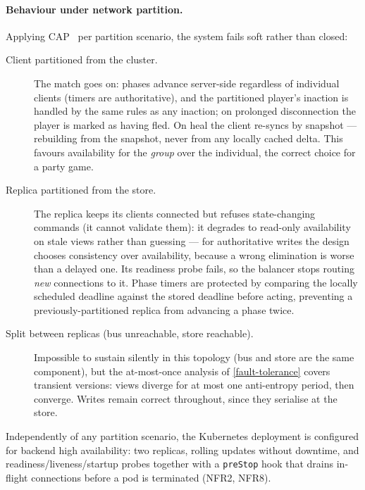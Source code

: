 \documentclass{scrartcl}
\begin{document}
\paragraph{Behaviour under network partition.}
Applying CAP~\cite{gilbert2002brewer} per partition scenario, the system fails
soft rather than closed:
\begin{description}
      \item[Client partitioned from the cluster.] The match goes on: phases advance
            server-side regardless of individual clients (timers are authoritative), and
            the partitioned player's inaction is handled by the same rules as any inaction;
            on prolonged disconnection the player is marked as having fled. On heal the
            client re-syncs by snapshot --- rebuilding from the snapshot, never from any
            locally cached delta. This favours availability for the \emph{group} over the
            individual, the correct choice for a party game.
      \item[Replica partitioned from the store.] The replica keeps its clients
            connected but refuses state-changing commands (it cannot validate them): it
            degrades to read-only availability on stale views rather than guessing --- for
            authoritative writes the design chooses consistency over availability, because a
            wrong elimination is worse than a delayed one. Its readiness probe fails, so the
            balancer stops routing \emph{new} connections to it. Phase timers are protected
            by comparing the locally scheduled deadline against the stored deadline before
            acting, preventing a previously-partitioned replica from advancing a phase
            twice.
      \item[Split between replicas (bus unreachable, store reachable).] Impossible to
            sustain silently in this topology (bus and store are the same component), but
            the at-most-once analysis of \cref{fault-tolerance} covers transient versions:
            views diverge for at most one anti-entropy period, then converge. Writes remain
            correct throughout, since they serialise at the store.
\end{description}
Independently of any partition scenario, the Kubernetes deployment is configured
for backend high availability: two replicas, rolling updates without downtime,
and readiness/liveness/startup probes together with a \texttt{preStop} hook that
drains in-flight connections before a pod is terminated (NFR2, NFR8).
\end{document}
